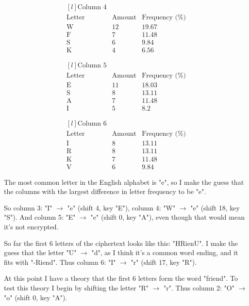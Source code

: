 \documentclass{article}
\begin{document}
	\[
	\begin{matrix*}[l]
	\text{Column 4} \\
	\text{Letter} & \text{Amount} & \text{Frequency (\%)} \\
	\text{W} & 12&19.67 \\
	\text{F} & 7&11.48 \\
	\text{S} & 6&9.84 \\
	\text{K} & 4&6.56
	\end{matrix*}
	\]
	
	\[
	\begin{matrix*}[l]
	\text{Column 5} \\
	\text{Letter} & \text{Amount} & \text{Frequency (\%)} \\
	\text{E} & 11&18.03 \\
	\text{S} & 8&13.11 \\
	\text{A} & 7&11.48 \\
	\text{I} & 5&8.2
	\end{matrix*}
	\]
	
	\[
	\begin{matrix*}[l]
	\text{Column 6} \\
	\text{Letter} & \text{Amount} & \text{Frequency (\%)} \\
	\text{I} & 8&13.11 \\
	\text{R} & 8&13.11 \\
	\text{K} & 7&11.48 \\
	\text{V} & 6&9.84
	\end{matrix*}
	\]
	
	The most common letter in the English alphabet is "e", so I make the guess that the columns with the largest difference in letter frequency to be "e".
	
	So column 3: "I" $\rightarrow$ "e" (shift 4, key "E"), column 4: "W" $\rightarrow$ "e" (shift 18, key "S"). And column 5: "E" $\rightarrow$ "e" (shift 0, key "A"), even though that would mean it's not encrypted.
	
	So far the first 6 letters of the ciphertext looks like this: "HRienU". I make the guess that the letter "U" $\rightarrow$ "d", as I think it's a common word ending, and it fits with "-Riend". Thus column 6: "I" $\rightarrow$ "r" (shift 17, key "R").
	
	At this point I have a theory that the first 6 letters form the word "friend". To test this theory I begin by shifting the letter "R" $\rightarrow$ "r". Thus column 2: "O" $\rightarrow$ "o" (shift 0, key "A").
	
\end{document}
